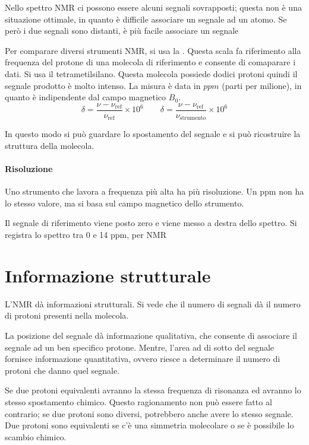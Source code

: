 Nello spettro NMR ci possono essere alcuni segnali sovrapposti; questa non è una situazione ottimale, in quanto è difficile associare un segnale ad un atomo.
Se però i due segnali sono distanti, è più facile associare un segnale

Per comparare diversi strumenti NMR, si usa la . Questa scala fa riferimento
alla frequenza del protone di una molecola di riferimento e consente di comaparare i dati.
Si usa il tetrametilsilano. Questa molecola possiede dodici protoni quindi il segnale prodotto è molto intenso. La misura è data in $ppm$
(parti per milione), in quanto è indipendente dal campo magnetico $B_0$.
\[
  \delta = \frac{\nu - \nu_{\text{ref}}}{\nu_{\text{ref}}} \times 10^6 \qquad \delta = \frac{\nu - \nu_{\text{ref}}}{\nu_{\text{strumento}}} \times 10^6
\]

In questo modo si può guardare lo spostamento del segnale e si può
ricostruire la struttura della molecola.

\paragraph{Risoluzione}

Uno strumento che lavora a frequenza più alta ha più risoluzione. Un ppm
non ha lo stesso valore, ma si basa sul campo magnetico dello strumento.



Il segnale di riferimento viene posto zero e viene messo a destra dello spettro.
Si registra lo spettro tra 0 e 14 ppm, per  NMR

\section{Informazione strutturale}

L'NMR dà informazioni strutturali. Si vede che il numero di segnali dà il numero di protoni presenti nella molecola.

La posizione del segnale dà informazione qualitativa, che consente di associare il segnale ad un ben specifico protone. Mentre, l'area ad di sotto del segnale fornisce informazione quantitativa,
ovvero riesce a determinare il numero di protoni che danno quel segnale.

Se due protoni equivalenti avranno la stessa frequenza di risonanza ed avranno lo stesso spostamento chimico. Questo ragionamento non può
essere fatto al contrario; se due protoni sono diversi, potrebbero anche
avere lo stesso segnale.
Due protoni sono equivalenti se c'è una simmetria molecolare o se è
possibile lo scambio chimico.

